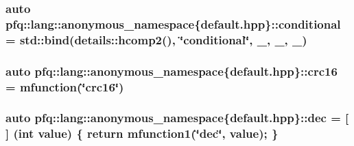 \hypertarget{namespacepfq_1_1lang_1_1anonymous__namespace_02default_8hpp_03_a99247b15a4e37c0aaec60838716fc8dc}{
\subsubsection[{conditional}]{\setlength{\rightskip}{0pt plus 5cm}auto pfq\+::lang\+::anonymous\+\_\+namespace\{default.\+hpp\}\+::conditional = std\+::bind(details\+::hcomp2(), \char`\"{}conditional\char`\"{}, \+\_, \+\_, \+\_)}}\label{namespacepfq_1_1lang_1_1anonymous__namespace_02default_8hpp_03_a99247b15a4e37c0aaec60838716fc8dc}
\hypertarget{namespacepfq_1_1lang_1_1anonymous__namespace_02default_8hpp_03_a358abfac3e7be63cbb4557616ab81f31}{
\subsubsection[{crc16}]{\setlength{\rightskip}{0pt plus 5cm}auto pfq\+::lang\+::anonymous\+\_\+namespace\{default.\+hpp\}\+::crc16 = {\bf mfunction}(\char`\"{}crc16\char`\"{})}}\label{namespacepfq_1_1lang_1_1anonymous__namespace_02default_8hpp_03_a358abfac3e7be63cbb4557616ab81f31}
\hypertarget{namespacepfq_1_1lang_1_1anonymous__namespace_02default_8hpp_03_a139906841e77a2eb86b761b27ceeb685}{
\subsubsection[{dec}]{\setlength{\rightskip}{0pt plus 5cm}auto pfq\+::lang\+::anonymous\+\_\+namespace\{default.\+hpp\}\+::dec = \mbox{[}$\,$\mbox{]} (int value) \{ return {\bf mfunction1}(\char`\"{}dec\char`\"{}, value); \}}}\label{namespacepfq_1_1lang_1_1anonymous__namespace_02default_8hpp_03_a139906841e77a2eb86b761b27ceeb685}
